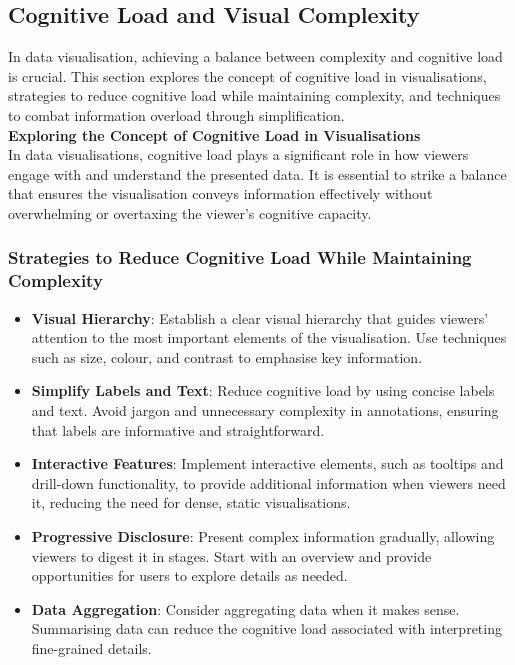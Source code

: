 \documentclass{article}\usepackage[]{graphicx}\usepackage[]{xcolor}
\begin{document}
\subsection{Cognitive Load and Visual Complexity}
In data visualisation, achieving a balance between complexity and cognitive load is crucial. This section explores the concept of cognitive load in visualisations, strategies to reduce cognitive load while maintaining complexity, and techniques to combat information overload through simplification.\\

\textbf{Exploring the Concept of Cognitive Load in Visualisations}\\
In data visualisations, cognitive load plays a significant role in how viewers engage with and understand the presented data. It is essential to strike a balance that ensures the visualisation conveys information effectively without overwhelming or overtaxing the viewer's cognitive capacity.

\subsubsection{Strategies to Reduce Cognitive Load While Maintaining Complexity}
\begin{itemize}
    \item \textbf{Visual Hierarchy}: Establish a clear visual hierarchy that guides viewers' attention to the most important elements of the visualisation. Use techniques such as size, colour, and contrast to emphasise key information.
    \item \textbf{Simplify Labels and Text}: Reduce cognitive load by using concise labels and text. Avoid jargon and unnecessary complexity in annotations, ensuring that labels are informative and straightforward.
    \item \textbf{Interactive Features}: Implement interactive elements, such as tooltips and drill-down functionality, to provide additional information when viewers need it, reducing the need for dense, static visualisations.
    \item \textbf{Progressive Disclosure}: Present complex information gradually, allowing viewers to digest it in stages. Start with an overview and provide opportunities for users to explore details as needed.
    \item \textbf{Data Aggregation}: Consider aggregating data when it makes sense. Summarising data can reduce the cognitive load associated with interpreting fine-grained details.
\end{itemize}
\end{document}
